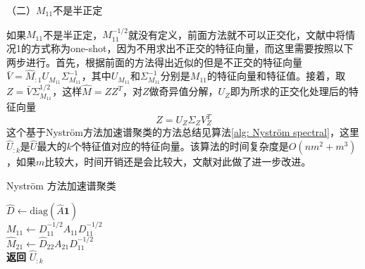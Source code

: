 （二）$M_{11}$不是半正定

如果$M_{11}$不是半正定，$M_{11}^{-1/2}$就没有定义，前面方法就不可以正交化，文献\cite{fowlkes2004spectral}中将情况1的方式称为one-shot，因为不用求出不正交的特征向量，而这里需要按照以下两步进行。首先，根据前面的方法得出近似的但是不正交的特征向量$\bar{V} = \hat{M}_{:1}U_{M_{11}}\Sigma_{M_{11}}^{-1}$，其中$U_{M_{11}}$和$\Sigma_{M_{11}}^{-1}$分别是$M_{11}$的特征向量和特征值。接着，取$Z = \bar{V}\Sigma_{M_{11}}^{1/2}$，这样$\hat{M} = ZZ^T$，对$Z$做奇异值分解，$U_Z$即为所求的正交化处理后的特征向量
\begin{equation*}
    Z = U_{Z}\Sigma_{Z}V_Z^T
\end{equation*}
这个基于Nyström方法加速谱聚类的方法总结见算法\ref{alg: Nyström spectral}，这里$\hat{U}_{:k}$是$\hat{U}$最大的$k$个特征值对应的特征向量。该算法的时间复杂度是$O(nm^2+m^3)$，如果$m$比较大，时间开销还是会比较大，文献\cite{li2011time,choromanska2013fast}对此做了进一步改进。
\begin{algorithm}
    \caption{Nyström 方法加速谱聚类}\label{alg: Nyström spectral}
    $\hat{D} \gets \text{diag}(\hat{A}\mathbf{1})$\\
    $M_{11} \gets D_{11}^{-1/2}A_{11}D_{11}^{-1/2}$ \\
    $\hat{M}_{21} \gets \hat{D}_{22}A_{21}D_{11}^{-1/2}$ \\
    \textbf{返回} $\hat{U}_{:k}$
\end{algorithm}

